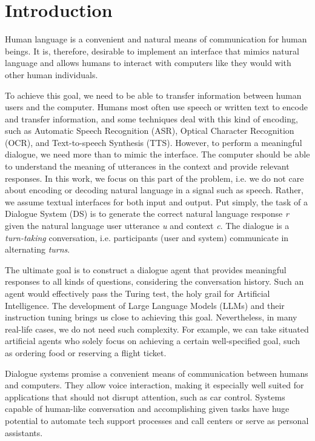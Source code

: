 \chapter{Introduction}%
\label{chap:intro}
Human language is a convenient and natural means of communication for human beings.
It is, therefore, desirable to implement an interface that mimics natural language and allows humans to interact with computers like they would with other human individuals.

To achieve this goal, we need to be able to transfer information between human users and the computer.
Humans most often use speech or written text to encode and transfer information, and some techniques deal with this kind of encoding, such as Automatic Speech Recognition (ASR), Optical Character Recognition (OCR), and Text-to-speech Synthesis (TTS).
However, to perform a meaningful dialogue, we need more than to mimic the interface.
The computer should be able to understand the meaning of utterances in the context and provide relevant responses.
In this work, we focus on this part of the problem, i.e. we do not care about encoding or decoding natural language in a signal such as speech.
Rather, we assume textual interfaces for both input and output.
Put simply, the task of a Dialogue System (DS) is to generate the correct natural language response \textit{r} given the natural language user utterance \textit{u} and context \textit{c}.
The dialogue is a \textit{turn-taking} conversation, i.e. participants (user and system) communicate in alternating \textit{turns}.

The ultimate goal is to construct a dialogue agent that provides meaningful responses to all kinds of questions, considering the conversation history.
Such an agent would effectively pass the Turing test, the holy grail for Artificial Intelligence.
The development of Large Language Models (LLMs) and their instruction tuning brings us close to achieving this goal.
Nevertheless, in many real-life cases, we do not need such complexity.
For example, we can take situated artificial agents who solely focus on achieving a certain well-specified goal, such as ordering food or reserving a flight ticket.

Dialogue systems promise a convenient means of communication between humans and computers.
They allow voice interaction, making it especially well suited for applications that should not disrupt attention, such as car control.
Systems capable of human-like conversation and accomplishing given tasks have huge potential to automate tech support processes and call centers or serve as personal assistants.

